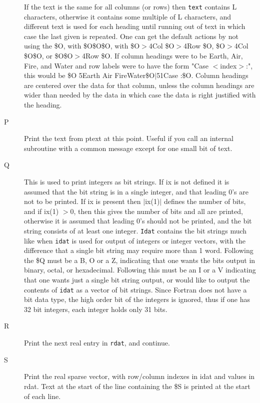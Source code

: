 \documentclass[12pt]{article}
\begin{document}
\begin{description}
  If the text is the same for all columns (or rows) then {\tt text} contains L
  characters, otherwise it contains some multiple of L characters, and different
  text is used for each heading until running out of text in which case the last
  given is repeated.  One can get the default actions by not using the \$O, with
  \$O\$O\$O, with \$O$>$4Col \$O$>$4Row \$O, \$O$>$4Col \$O\$O, or \$O\$O$>$4Row
  \$O.  If column headings were to be Earth, Air, Fire, and Water and row labels
  were to have the form "Case $<$index$>$:", this would be \$O 5Earth Air
  FireWater\$O$|$51Case :\$O.  Column headings are centered over the data for
  that column, unless the column headings are wider than needed by the data in
  which case the data is right justified with the heading.

\item[P] Print the text from ptext at this point.  Useful if you call an
  internal subroutine with a common message except for one small bit of text.

\item[Q] This is used to print integers as bit strings.  If ix is not defined it
  is assumed that the bit string is in a single integer, and that leading 0's
  are not to be printed.  If ix is present then $|$ix(1)$|$ defines the number
  of bits, and if ix(1) $> 0$, then this gives the number of bits and all are
  printed, otherwise it is assumed that leading 0's should not be printed, and
  the bit string consists of at least one integer.  {\tt Idat} contains the bit
  strings much like when {\tt idat} is used for output of integers or integer
  vectors, with the difference that a single bit string may require more than 1
  word.  Following the \$Q must be a B, O or a Z, indicating that one wants the
  bits output in binary, octal, or hexadecimal.  Following this must be an I or
  a V indicating that one wants just a single bit string output, or would like
  to output the contents of {\tt idat} as a vector of bit strings.  Since
  Fortran does not have a bit data type, the high order bit of the integers is
  ignored, thus if one has 32 bit integers, each integer holds only 31 bits.

\item[R] Print the next real entry in {\tt rdat}, and continue.

\item[S] Print the real sparse vector, with row/column indexes in idat and
  values in rdat.  Text at the start of the line containing the \$S is printed
  at the start of each line.


\end{description}
\end{document}
